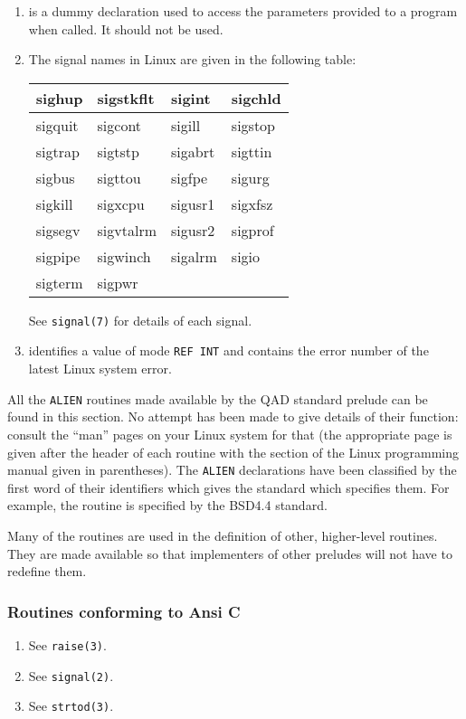 \begin{enumerate}
\item {} is a dummy declaration used to access the
parameters provided to a program when called. It should not be used.
\item The signal names in Linux are given in the following table:
\begin{center}
\begin{tabular}{|l|l|l|l|}
\hline
sighup  & sigstkflt & sigint  & sigchld \\ \hline
sigquit & sigcont   & sigill  & sigstop \\ \hline
sigtrap & sigtstp   & sigabrt & sigttin \\ \hline
sigbus  & sigttou   & sigfpe  & sigurg  \\ \hline
sigkill & sigxcpu   & sigusr1 & sigxfsz \\ \hline
sigsegv & sigvtalrm & sigusr2 & sigprof \\ \hline
sigpipe & sigwinch  & sigalrm & sigio   \\ \hline
sigterm & sigpwr    &         &         \\ \hline
\end{tabular}
\end{center}
See \verb|signal(7)| for details of each signal.
\item {} identifies a value of mode \verb|REF INT| and
contains the error number of the latest Linux system error.
\end{enumerate}

All the \verb|ALIEN| routines made available by the QAD standard
prelude can be found in this section. No attempt has been made to
give details of their function: consult the ``man'' pages on your
Linux system for that (the appropriate page is given after the header
of each routine with the section of the Linux programming manual
given in parentheses). The \verb|ALIEN| declarations have been
classified by the first word of their identifiers which gives the
standard which specifies them. For example, the routine  is specified by the BSD4.4 standard.

Many of the routines are used in the definition of other,
higher-level routines. They are made available so that implementers
of other preludes will not have to redefine them.

\subsubsection*{Routines conforming to Ansi C}
\begin{enumerate}
\item {}\newline
See \verb|raise(3)|.
\item {}\newline
See \verb|signal(2)|.
\item {}\newline
See \verb|strtod(3)|.
\end{enumerate}

